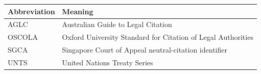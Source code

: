 \noindent\begin{tabularx}{\textwidth}{@{}lX@{}}
\toprule
Abbreviation & Meaning \\
\midrule
AGLC & Australian Guide to Legal Citation \\
OSCOLA & Oxford University Standard for Citation of Legal Authorities \\
SGCA & Singapore Court of Appeal neutral-citation identifier \\
UNTS & United Nations Treaty Series \\
\bottomrule
\end{tabularx}
